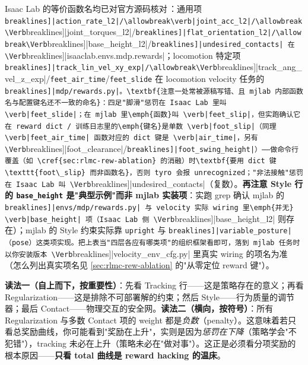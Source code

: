 Isaac Lab 的等价函数名均已对官方源码核对\,\cite{isaaclab2024}：通用项 \Verb[breaklines]|action_rate_l2|/\allowbreak\verb|joint_acc_l2|/\allowbreak\Verb[breaklines]|joint_torques_l2|/\allowbreak\Verb[breaklines]|flat_orientation_l2|/\allowbreak\Verb[breaklines]|base_height_l2|/\allowbreak\Verb[breaklines]|undesired_contacts| 在 \Verb[breaklines]|isaaclab.envs.mdp.rewards|；locomotion 特定项 \Verb[breaklines]|track_lin_vel_xy_exp|/\allowbreak\Verb[breaklines]|track_ang_vel_z_exp|/\allowbreak\verb|feet_air_time|/\allowbreak\verb|feet_slide| 在 locomotion velocity 任务的 \Verb[breaklines]|mdp/rewards.py|。\textbf{注意一处常被源稿写错、且 mjlab 内部函数名与配置键名还不一致的命名}：四足"脚滑"惩罚在 Isaac Lab 里叫 \verb|feet_slide|；在 mjlab 里\emph{函数}叫 \verb|feet_slip|，但实跑确认它在 reward dict / 训练日志里的\emph{键名}是单数 \verb|foot_slip|（同理 \verb|feet_air_time| 函数对应的 dict 键是 \verb|air_time|，另有 \Verb[breaklines]|foot_clearance|/\allowbreak\Verb[breaklines]|foot_swing_height|）——做命令行覆盖（如 \cref{sec:rlmc-rew-ablation} 的消融）时\textbf{要用 dict 键 \texttt{foot\_slip} 而非函数名}，否则 tyro 会报 unrecognized；"非法接触"惩罚在 Isaac Lab 叫 \Verb[breaklines]|undesired_contacts|（复数）。\textbf{再注意 Style 行的 \texttt{base\_height} 是"典型示例"而非 mjlab 实装项}：实跑 grep 确认 mjlab 的 \Verb[breaklines]|envs/mdp/rewards.py| 与 velocity 实际 wiring 里\emph{并无} \verb|base_height| 项（Isaac Lab 侧 \Verb[breaklines]|base_height_l2| 则存在）；mjlab 的 Style 约束实际靠 \verb|upright| 与 \Verb[breaklines]|variable_posture|（pose）这类项实现。把上表当"四层各应有哪类项"的组织框架看即可，落到 mjlab 任务时以你安装版本 \Verb[breaklines]|velocity_env_cfg.py| 里真实 wiring 的项名为准（怎么列出真实项名见 \cref{sec:rlmc-rew-ablation} 的"从零定位 reward 键"）。

\begin{insight}\label{ins:rlmc-rew-tworead}
\textbf{读法一（自上而下，按重要性）}：先看 Tracking 行——这是策略存在的意义；再看 Regularization——这是排除不可部署解的约束；然后 Style——行为质量的调节器；最后 Contact——物理交互的安全网。\textbf{读法二（横向，按符号）}：所有 Regularization 与多数 Contact 项的 weight 都是\emph{负数}（penalty）。这意味着若只看总奖励曲线，你可能看到"奖励在上升"，实则是因为\emph{惩罚在下降}（策略学会"不犯错"），tracking 未必在上升（策略未必在"做对事"）。这正是必须看分项奖励的根本原因——\textbf{只看 total 曲线是 reward hacking 的温床}。
\end{insight}


